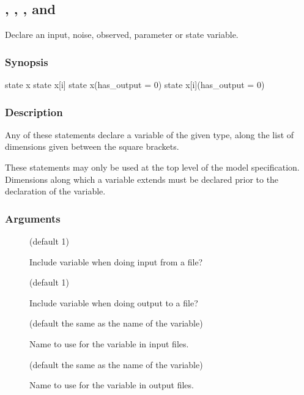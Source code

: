 \subsection{\label{input}, \label{noise}, \label{obs}, \label{param} and \label{state}}

Declare an input, noise, observed, parameter or state variable.

\subsubsection*{Synopsis\label{var_Synopsis}}

\begin{bicode}
state x
state x[i]
state x(has_output = 0)
state x[i](has_output = 0)
\end{bicode}

\subsubsection*{Description\label{var_Description}}

Any of these statements declare a variable of the given type, along the list
of dimensions given between the square brackets.

These statements may only be used at the top level of the model
specification. Dimensions along which a variable extends must be declared
prior to the declaration of the variable.

\subsubsection*{Arguments\label{var_Arguments}}

\begin{description}
\item[] (default 1)

Include variable when doing input from a file?

\item[] (default 1)

Include variable when doing output to a file?

\item[] (default the same as the name of the
  variable)

Name to use for the variable in input files.

\item[] (default the same as the name of the
  variable)

Name to use for the variable in output files.
\end{description}

